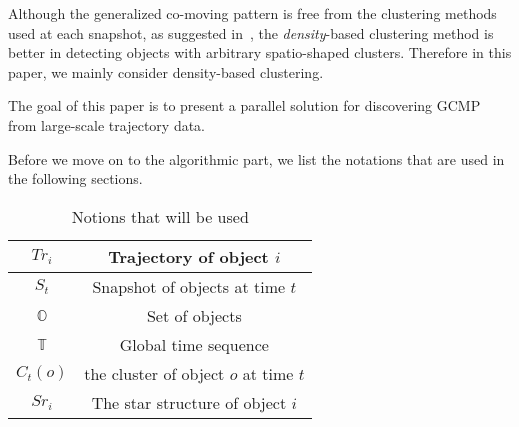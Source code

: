 Although the generalized co-moving pattern is free from the clustering methods used at each snapshot, as suggested in~\cite{jeung2008convoy}, the \emph{density}-based clustering method is better in detecting objects with arbitrary spatio-shaped clusters. Therefore in this paper, we mainly consider density-based clustering.

The goal of this paper is to present a parallel solution for discovering GCMP from large-scale trajectory data.

Before we move on to the algorithmic part, we list the notations that are used in the following sections.

\begin{table}
\begin{tabular}{|c|c|}
\hline 
$Tr_i$ & Trajectory of object $i$\\ 
\hline
$S_t$ & Snapshot of objects at time $t$ \\
\hline 
$\mathbb{O}$ & Set of objects \\ 
\hline 
$\mathbb{T}$ & Global time sequence \\
\hline
$C_t(o)$ & the cluster of object $o$ at time $t$ \\
\hline 
$Sr_i $ &  The star structure of object $i$ \\
\hline 
\end{tabular} 
\caption{Notions that will be used}
\end{table}